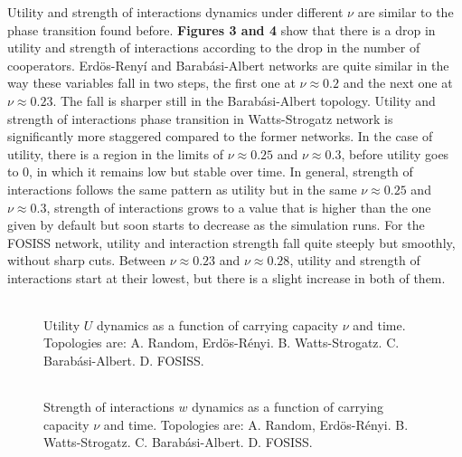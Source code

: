 \documentclass{bmcart}
\def\texttt{[image: ]}
\begin{document}
Utility and strength of interactions dynamics under different $\nu$ are similar to the
phase transition found before. \textbf{Figures 3 and 4} show
that there is a drop in utility and strength of interactions according to the
drop in the number of cooperators. Erd\"{o}s-Reny\'i and Barab\'asi-Albert
networks are quite similar in the way these variables fall in two steps, the
first one at $\nu \approx 0.2$ and the next one at $\nu \approx 0.23$. The fall
is sharper still in the Barab\'asi-Albert topology. Utility and strength of
interactions phase transition in Watts-Strogatz network is significantly more
staggered compared to the former networks. In the case of utility, there is a
region in the limits of $\nu \approx 0.25$ and $\nu \approx 0.3$, before utility
goes to $0$, in which it remains low but stable over time. In general, strength
of interactions follows the same pattern as utility but in the same $\nu \approx
0.25$ and $\nu \approx 0.3$, strength of interactions grows to a value that is
higher than the one given by default but soon starts to decrease as the
simulation runs. For the FOSISS network, utility and interaction strength fall
quite steeply but smoothly, without sharp cuts. Between $\nu \approx 0.23$ and
$\nu \approx 0.28$, utility and strength of interactions start at their lowest,
but there is a slight increase in both of them.\\


\begin{figure} [h!]
\centering
\begin{tabular}{cc}

\end{tabular}
\caption{Utility $U$ dynamics as a function of carrying capacity $\nu$ and time. Topologies are: A. Random, Erd\"{o}s-R\'enyi. B. Watts-Strogatz. C. Barab\'asi-Albert. D. FOSISS.}\label{fitness}
\end{figure}



\begin{figure} [h!]
\centering
\begin{tabular}{cc}

\end{tabular}
\caption{Strength of interactions $w$ dynamics as a function of carrying capacity $\nu$ and time. Topologies are: A. Random, Erd\"{o}s-R\'enyi. B. Watts-Strogatz. C. Barab\'asi-Albert. D. FOSISS.}\label{trust}
\end{figure}
\end{document}
